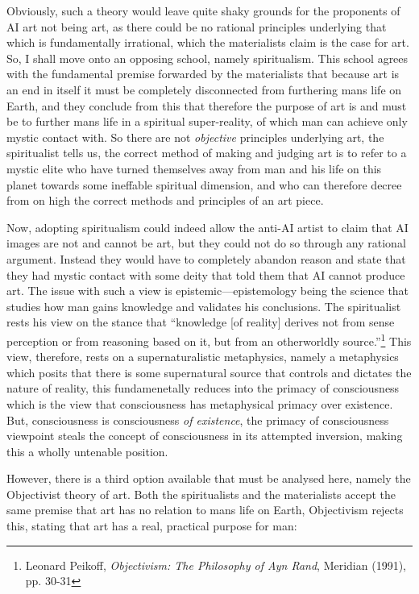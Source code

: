 \documentclass[11pt]{article}
\begin{document}
Obviously, such a theory would leave quite shaky grounds for the proponents of AI art not being art, as there could be no rational principles underlying that which is fundamentally irrational, which the materialists claim is the case for art. So, I shall move onto an opposing school, namely spiritualism. This school agrees with the fundamental premise forwarded by the materialists that because art is an end in itself it must be completely disconnected from furthering mans life on Earth, and they conclude from this that therefore the purpose of art is and must be to further mans life in a spiritual super-reality, of which man can achieve only mystic contact with. So there are not \emph{objective} principles underlying art, the spiritualist tells us, the correct method of making and judging art is to refer to a mystic elite who have turned themselves away from man and his life on this planet towards some ineffable spiritual dimension, and who can therefore decree from on high the correct methods and principles of an art piece.

Now, adopting spiritualism could indeed allow the anti-AI artist to claim that AI images are not and cannot be art, but they could not do so through any rational argument. Instead they would have to completely abandon reason and state that they had mystic contact with some deity that told them that AI cannot produce art. The issue with such a view is epistemic---epistemology being the science that studies how man gains knowledge and validates his conclusions. The spiritualist rests his view on the stance that ``knowledge [of reality] derives not from sense perception or from reasoning based on it, but from an otherworldly source.''\footnote{Leonard Peikoff, \emph{Objectivism: The Philosophy of Ayn Rand}, Meridian (1991), pp. 30-31} This view, therefore, rests on a supernaturalistic metaphysics, namely a metaphysics which posits that there is some supernatural source that controls and dictates the nature of reality, this fundamenetally reduces into the primacy of consciousness which is the view that consciousness has metaphysical primacy over existence. But, consciousness is consciousness \emph{of existence}, the primacy of consciousness viewpoint steals the concept of consciousness in its attempted inversion, making this a wholly untenable position.

However, there is a third option available that must be analysed here, namely the Objectivist theory of art. Both the spiritualists and the materialists accept the same premise that art has no relation to mans life on Earth, Objectivism rejects this, stating that art has a real, practical purpose for man:
\end{document}
